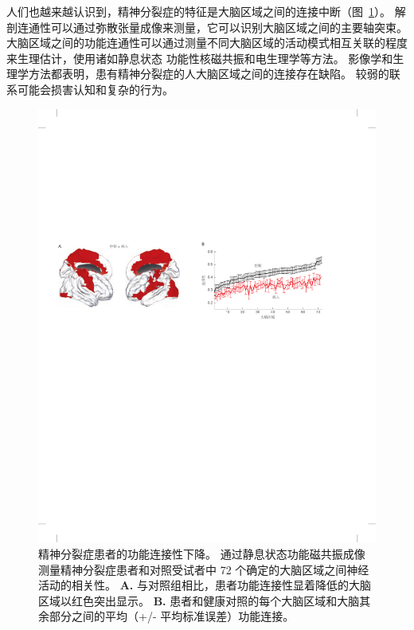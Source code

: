 人们也越来越认识到，精神分裂症的特征是大脑区域之间的连接中断（图~\ref{fig:60_5}）。
解剖连通性可以通过弥散张量成像来测量，它可以识别大脑区域之间的主要轴突束。
大脑区域之间的功能连通性可以通过测量不同大脑区域的活动模式相互关联的程度来生理估计，使用诸如静息状态 功能性核磁共振和电生理学等方法。
影像学和生理学方法都表明，患有精神分裂症的人大脑区域之间的连接存在缺陷。
较弱的联系可能会损害认知和复杂的行为。


\begin{figure}[htbp]
	\centering
	\includegraphics[width=1.0\linewidth]{chap60/fig_60_5}
	\caption{精神分裂症患者的功能连接性下降。
		通过静息状态功能磁共振成像测量精神分裂症患者和对照受试者中 72 个确定的大脑区域之间神经活动的相关性\cite{lynall2010functional}。
		\textbf{A.} 与对照组相比，患者功能连接性显着降低的大脑区域以红色突出显示。
		\textbf{B.} 患者和健康对照的每个大脑区域和大脑其余部分之间的平均（+/- 平均标准误差）功能连接。}
	\label{fig:60_5}
\end{figure}



